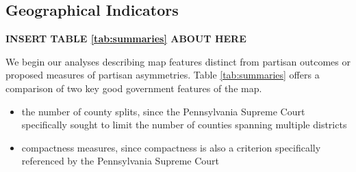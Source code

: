         \subsection*{Geographical Indicators}
    
        \begin{center}\textbf{INSERT TABLE \ref{tab:summaries} ABOUT HERE} \end{center}
\par
    We begin our analyses describing map features distinct from partisan outcomes or proposed measures of partisan asymmetries. Table \ref{tab:summaries} offers a comparison of two key good government features of the map.
%
    \begin{itemize}
        \item the number of county splits, since the Pennsylvania Supreme Court specifically sought to limit the number of counties spanning multiple districts
        \item compactness measures, since compactness is also a criterion specifically referenced by the Pennsylvania Supreme Court
    \end{itemize}
%
\par
